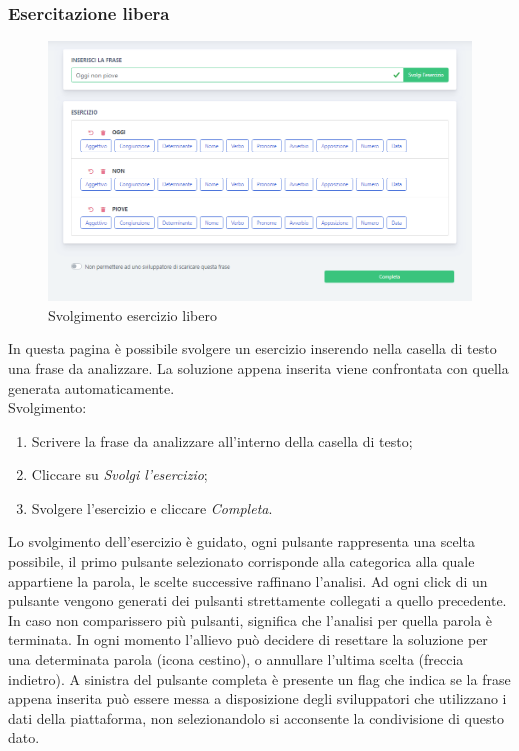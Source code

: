 		 \subsubsection{Esercitazione libera}      
        	\begin{figure}[H]
                \centering
                \includegraphics[width=17cm]{sez/img/studente/esercitazioneLiberaEsegui.PNG} 
                \caption{Svolgimento esercizio libero}\label{fig:1}
        	\end{figure}
          In questa pagina è possibile svolgere un esercizio inserendo nella casella di testo una frase da analizzare. La soluzione appena inserita viene confrontata con quella generata automaticamente.
        \\ Svolgimento:
        	\begin{enumerate}        
            	\item Scrivere la frase da analizzare all'interno della casella di testo;
            	\item Cliccare su \textit{Svolgi l'esercizio};
            	\item Svolgere l'esercizio e cliccare \textit{Completa}.
        	\end{enumerate}
        	\label{sec:esLib}
        	Lo svolgimento dell'esercizio è guidato, ogni pulsante rappresenta una scelta possibile, il primo pulsante selezionato corrisponde alla categorica alla quale appartiene la parola, le scelte successive raffinano l'analisi. Ad ogni click di un pulsante vengono generati dei pulsanti strettamente collegati a quello precedente. In caso non comparissero più pulsanti, significa che l'analisi per quella parola è terminata. In ogni momento l'allievo può decidere di resettare la soluzione per una determinata parola (icona cestino), o annullare l'ultima scelta (freccia indietro).        \linebreak	
        A sinistra del pulsante completa è presente un {flag} che indica se la frase appena inserita può essere messa a disposizione degli sviluppatori che utilizzano i dati della piattaforma, non selezionandolo si acconsente la condivisione di questo dato.
        	

